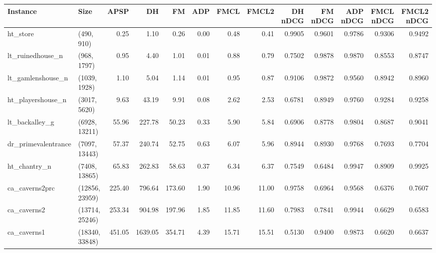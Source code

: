 \begin{tabular}{llrrrrrrrrrrr}
\toprule
           Instance &           Size &   APSP &      DH &     FM &  ADP &  FMCL &  FMCL2 &  DH nDCG &  FM nDCG &  ADP nDCG &  FMCL nDCG &  FMCL2 nDCG \\
\midrule
           ht\_store &     (490, 910) &   0.25 &    1.10 &   0.26 & 0.00 &  0.48 &   0.41 &   0.9905 &   0.9601 &    0.9786 &     0.9306 &      0.9492 \\
   lt\_ruinedhouse\_n &    (968, 1797) &   0.95 &    4.40 &   1.01 & 0.01 &  0.88 &   0.79 &   0.7502 &   0.9878 &    0.9870 &     0.8553 &      0.8747 \\
  lt\_gamlenshouse\_n &   (1039, 1928) &   1.10 &    5.04 &   1.14 & 0.01 &  0.95 &   0.87 &   0.9106 &   0.9872 &    0.9560 &     0.8942 &      0.8960 \\
  ht\_playershouse\_n &   (3017, 5620) &   9.63 &   43.19 &   9.91 & 0.08 &  2.62 &   2.53 &   0.6781 &   0.8949 &    0.9760 &     0.9284 &      0.9258 \\
     lt\_backalley\_g &  (6928, 13211) &  55.96 &  227.78 &  50.23 & 0.33 &  5.90 &   5.84 &   0.6906 &   0.8778 &    0.9804 &     0.8687 &      0.9041 \\
dr\_primevalentrance &  (7097, 13443) &  57.37 &  240.74 &  52.75 & 0.63 &  6.07 &   5.96 &   0.8944 &   0.8930 &    0.9768 &     0.7693 &      0.7704 \\
       ht\_chantry\_n &  (7408, 13865) &  65.83 &  262.83 &  58.63 & 0.37 &  6.34 &   6.37 &   0.7549 &   0.6484 &    0.9947 &     0.8909 &      0.9925 \\
     ca\_caverns2prc & (12856, 23959) & 225.40 &  796.64 & 173.60 & 1.90 & 10.96 &  11.00 &   0.9758 &   0.6964 &    0.9568 &     0.6376 &      0.7607 \\
        ca\_caverns2 & (13714, 25246) & 253.34 &  904.98 & 197.96 & 1.85 & 11.85 &  11.60 &   0.7983 &   0.7841 &    0.9944 &     0.6629 &      0.6583 \\
        ca\_caverns1 & (18340, 33848) & 451.05 & 1639.05 & 354.71 & 4.39 & 15.71 &  15.51 &   0.5130 &   0.9400 &    0.9873 &     0.6620 &      0.6637 \\
\bottomrule
\end{tabular}
